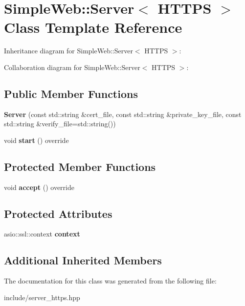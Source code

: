 \hypertarget{classSimpleWeb_1_1Server_3_01HTTPS_01_4}{}\section{Simple\+Web\+:\+:Server$<$ H\+T\+T\+PS $>$ Class Template Reference}
\label{classSimpleWeb_1_1Server_3_01HTTPS_01_4}


Inheritance diagram for Simple\+Web\+:\+:Server$<$ H\+T\+T\+PS $>$\+:


Collaboration diagram for Simple\+Web\+:\+:Server$<$ H\+T\+T\+PS $>$\+:
\subsection*{Public Member Functions}
\begin{DoxyCompactItemize}
\item 
{\bfseries Server} (const std\+::string \&cert\+\_\+file, const std\+::string \&private\+\_\+key\+\_\+file, const std\+::string \&verify\+\_\+file=std\+::string())\hypertarget{classSimpleWeb_1_1Server_3_01HTTPS_01_4_a15bb179287dfaa18da16b8877174e8d6}{}\label{classSimpleWeb_1_1Server_3_01HTTPS_01_4_a15bb179287dfaa18da16b8877174e8d6}

\item 
void {\bfseries start} () override\hypertarget{classSimpleWeb_1_1Server_3_01HTTPS_01_4_a5dea84b313d02cfa79b10ec535c70739}{}\label{classSimpleWeb_1_1Server_3_01HTTPS_01_4_a5dea84b313d02cfa79b10ec535c70739}

\end{DoxyCompactItemize}
\subsection*{Protected Member Functions}
\begin{DoxyCompactItemize}
\item 
void {\bfseries accept} () override\hypertarget{classSimpleWeb_1_1Server_3_01HTTPS_01_4_a220d24901bc8094bb038879a95aa08fb}{}\label{classSimpleWeb_1_1Server_3_01HTTPS_01_4_a220d24901bc8094bb038879a95aa08fb}

\end{DoxyCompactItemize}
\subsection*{Protected Attributes}
\begin{DoxyCompactItemize}
\item 
asio\+::ssl\+::context {\bfseries context}\hypertarget{classSimpleWeb_1_1Server_3_01HTTPS_01_4_a8d18adcb64d1527a417cca04010c92c9}{}\label{classSimpleWeb_1_1Server_3_01HTTPS_01_4_a8d18adcb64d1527a417cca04010c92c9}

\end{DoxyCompactItemize}
\subsection*{Additional Inherited Members}


The documentation for this class was generated from the following file\+:\begin{DoxyCompactItemize}
\item 
include/server\+\_\+https.\+hpp\end{DoxyCompactItemize}
